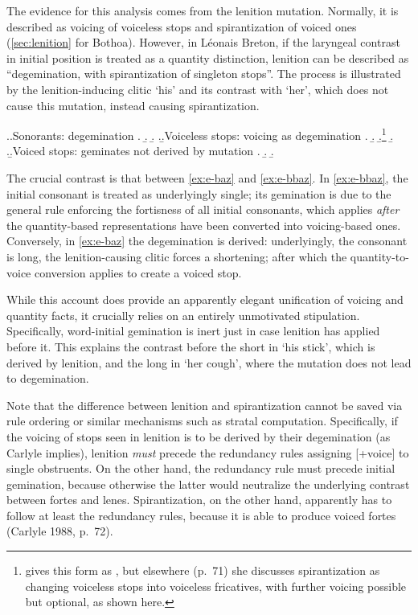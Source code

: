 The evidence for this analysis comes from the lenition mutation. Normally, it is described as voicing of voiceless stops and spirantization of voiced ones (\cf \cref{sec:lenition} for Bothoa). However, in Léonais Breton, if the laryngeal contrast in initial position is treated as a quantity distinction, lenition can be described as \enquote{degemination, with spirantization of singleton stops}. The process is illustrated by the lenition-inducing clitic \ipa{[e]} `his' and its contrast with \ipa{[e]} `her', which does not cause this mutation, instead causing spirantization.

\ex.\a.Sonorants: degemination
\a.
\b.
\b.
\z.\b.Voiceless stops: voicing as degemination
\a.
\b.\label{ex:e-baz}
\b.\footnote{\citet[p.~53]{carlyle88:_breton} gives this form as \ipa{[e ˈvːaːs]}, but elsewhere (p.~71) she discusses spirantization as changing voiceless stops into voiceless fricatives, with further voicing possible but optional, as shown here.}
\b.\mbi{[e ˈf̬ːaːs]}
\z.\b.Voiced stops: geminates not derived by mutation
\a.
\b.
\b.\label{ex:e-bbaz}

The crucial contrast is that between \ref{ex:e-baz} and \ref{ex:e-bbaz}. In \cref{ex:e-bbaz}, the initial consonant is treated as underlyingly single; its gemination is due to the general rule enforcing the fortisness of all initial consonants, which applies \emph{after} the quantity\hyp based representations have been converted into voicing\hyp based ones. Conversely, in \cref{ex:e-baz} the degemination is derived: underlyingly, the consonant is long, the lenition\hyp causing clitic forces a shortening; after which the quantity\hyp to\hyp voice conversion applies to create a voiced stop.

While this account does provide an apparently elegant unification of voicing and quantity facts, it crucially relies on an entirely unmotivated stipulation. Specifically, word\hyp initial gemination is inert just in case lenition has applied before it. This explains the contrast before the short \ipa{[v]} in \ipa{[e ˈvaːs]} `his stick', which is derived by lenition, and the long \ipa{[f̬]} in \ipa{[e ˈf̬ːaːs]} `her cough', where the mutation does not lead to degemination.

Note that the difference between lenition and spirantization cannot be saved via rule ordering or similar mechanisms such as stratal computation. Specifically, if the voicing of stops seen in lenition is to be derived by their degemination (as Carlyle implies), lenition \emph{must} precede the redundancy rules assigning [+voice] to single obstruents. On the other hand, the redundancy rule must precede initial gemination, because otherwise the latter would neutralize the underlying contrast between fortes and lenes. Spirantization, on the other hand, apparently has to follow at least the redundancy rules, because it is able to produce voiced fortes (\cf Carlyle 1988, p.~72).

